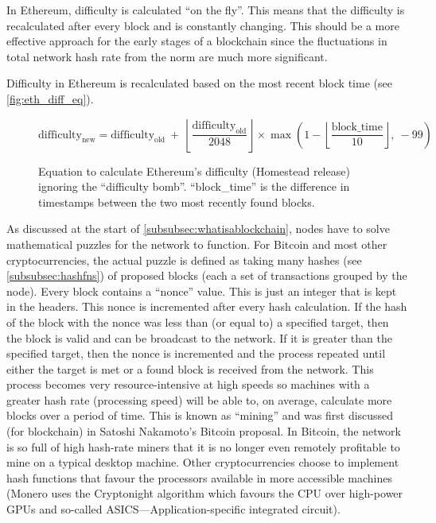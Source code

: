 \documentclass{article}
\begin{document}
In Ethereum, difficulty is calculated ``on the fly''. This means that the difficulty is recalculated after every block and is constantly changing. This should be a more effective approach for the early stages of a blockchain since the fluctuations in total network hash rate from the norm are much more significant.

Difficulty in Ethereum is recalculated based on the most recent block time (see \autoref{fig:eth_diff_eq}).
\begin{figure}[h]
    \[\textrm{difficulty}_{\textrm{new}} = \textrm{difficulty}_{\textrm{old}}
    \ + \ \left\lfloor\dfrac{\textrm{difficulty}_{\textrm{old}}}{2048}\right\rfloor \times \max\left(1- \left\lfloor \frac{\textrm{block\_time}}{10} \right\rfloor,\ -99\right)\]
    \caption{Equation to calculate Ethereum's difficulty (Homestead release) ignoring the ``difficulty bomb''\cite{medium_bt_mystery}. ``block\_time'' is the difference in timestamps between the two most recently found blocks.}
    \label{fig:eth_diff_eq}
\end{figure}

As discussed at the start of \autoref{subsubsec:whatisablockchain}, nodes have to solve mathematical puzzles for the network to function. For Bitcoin and most other cryptocurrencies, the actual puzzle is defined as taking many hashes (see \autoref{subsubsec:hashfns}) of proposed blocks (each a set of transactions grouped by the node). Every block contains a ``nonce'' value. This is just an integer that is kept in the headers. This nonce is incremented after every hash calculation. If the hash of the block with the nonce was less than (or equal to) a specified target, then the block is valid and can be broadcast to the network. If it is greater than the specified target, then the nonce is incremented and the process repeated until either the target is met or a found block is received from the network. This process becomes very resource-intensive at high speeds so machines with a greater hash rate (processing speed) will be able to, on average, calculate more blocks over a period of time. This is known as ``mining'' and was first discussed (for blockchain) in Satoshi Nakamoto's Bitcoin proposal\cite{bitcoin_paper}. In Bitcoin, the network is so full of high hash-rate miners that it is no longer even remotely profitable to mine on a typical desktop machine. Other cryptocurrencies choose to implement hash functions that favour the processors available in more accessible machines (Monero uses the Cryptonight algorithm\cite{cryptonight_docs} which favours the CPU over high-power GPUs and so-called ASICS---Application-specific integrated circuit).
\end{document}
